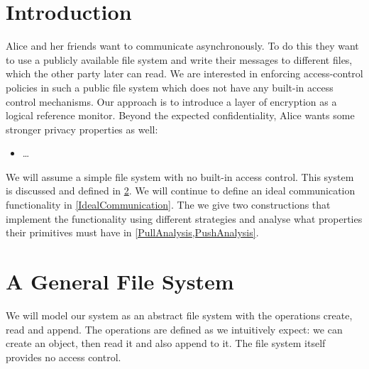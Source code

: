 \acresetall{}
\section{Introduction}\label{Introduction}

Alice and her friends want to communicate asynchronously.
To do this they want to use a publicly available file system and write their 
messages to different files, which the other party later can read.
We are interested in enforcing access-control policies in such a public file 
system which does not have any built-in access control mechanisms.
Our approach is to introduce a layer of encryption as a logical reference 
monitor.
Beyond the expected confidentiality, Alice wants some stronger privacy 
properties as well:
\begin{itemize}
  \item \dots
\end{itemize}

We will assume a simple file system with no built-in access control.
This system is discussed and defined in \cref{FileSystem}.
We will continue to define an ideal communication functionality in 
\cref{IdealCommunication}.
The we give two constructions that implement the functionality using different 
strategies and analyse what properties their primitives must have in 
\cref{PullAnalysis,PushAnalysis}.



\section{A General File System}\label{FileSystem}

We will model our system as an abstract file system with the operations create, 
read and append.
The operations are defined as we intuitively expect: we can create an object, 
then read it and also append to it.
The file system itself provides no access control.

